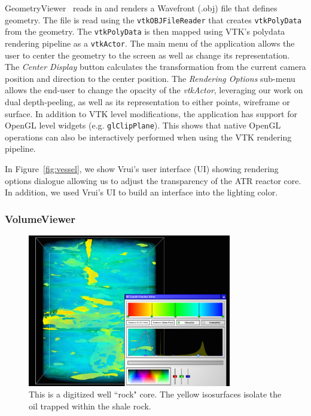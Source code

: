 GeometryViewer~\cite{GeometryViewer} reads in and renders a Wavefront (.obj) file that defines geometry. The file is read using the \texttt{vtkOBJFileReader} that creates \texttt{vtkPolyData} from the geometry. The \texttt{vtkPolyData} is then mapped using VTK's polydata rendering pipeline as a \texttt{vtkActor}. The main menu of the application allows the user to center the geometry to the screen as well as change its representation. The \textit{Center Display} button calculates the transformation from the current camera position and direction to the center position. The \textit{Rendering Options} sub-menu allows the end-user to change the opacity of the \textit{vtkActor}, leveraging our work on dual depth-peeling, as well as its representation to either points, wireframe or surface. In addition to VTK level modifications, the application has support for OpenGL level widgets (e.g. \texttt{glClipPlane}). This shows that native OpenGL operations can also be interactively performed when using the VTK rendering pipeline.

In Figure~\ref{fig:vessel}, we show Vrui's user interface (UI) showing rendering options dialogue allowing us to adjust the transparency of the ATR reactor core. In addition, we used Vrui's UI to build an interface into the lighting color.

\subsubsection{VolumeViewer}

\begin{figure}[h!]
 \centering
 \includegraphics[width=3.5in]{images/rock-transferfunction.png}
 \caption{This is a digitized well ``rock" core. The yellow isosurfaces isolate the oil trapped within the shale rock.}
 \label{fig:volume}
\end{figure}

